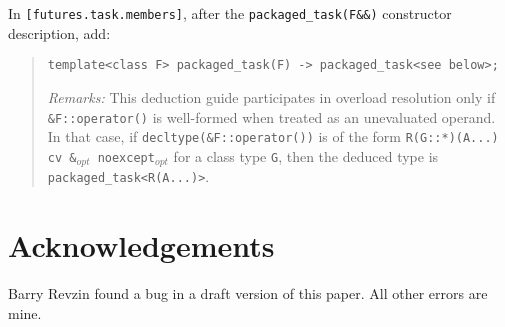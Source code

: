 \documentclass[11pt]{article}
\begin{document}
In \texttt{[futures.task.members]}, after the
\texttt{packaged\_task(F\&\&)} constructor description, add:

\begin{quote}
\texttt{template<class F> packaged\_task(F) -> packaged\_task<see below>;}

\textit{Remarks:} This deduction guide participates in overload
resolution only if \texttt{\&F​::​operator()} is well-formed when treated
as an unevaluated operand.  In that case, if
\texttt{decltype(\&F​::​operator())} is of the form
\texttt{R(G​::​*)(A...) cv \&$_{opt}$ noexcept$_{opt}$} for a class type
\texttt{G}, then the deduced type is \texttt{packaged\_task<R(A...)>}.
\end{quote}

\section{Acknowledgements}

Barry Revzin found a bug in a draft version of this paper. All other
errors are mine.

%
%
\end{document}
